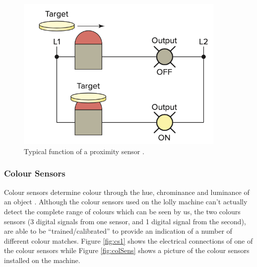 \begin{figure}[H]
\begin{minipage}{0.35\textwidth}
        \includegraphics[width = 0.9\textwidth]{2_images/proxSens.png}
        \caption{Typical function of a proximity sensor \cite{petruzella2017programmable}.}
        \label{fig:proxSens}
    \end{minipage}\hfill 
    \end{figure}
 \newpage
    
    \subsubsection{Colour Sensors}
        Colour sensors determine colour through the hue, chrominance and luminance of an object \cite{sickCs}.
        Although the colour sensors used on the lolly machine can’t actually detect the complete range of colours which can be seen by us, the two colours sensors (3 digital signals from one sensor, and 1 digital signal from the second), are able to be “trained/calibrated” to provide an indication of a number of different colour matches.
        Figure \ref{fig:cs1} shows the electrical connections of one of the colour sensors while Figure \ref{fig:colSens} shows a picture of the colour sensors installed on the machine.

